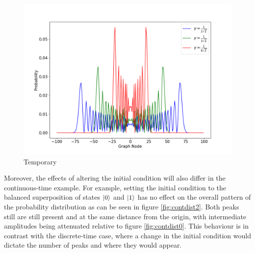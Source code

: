                \begin{figure}[!h]
                    \centering
                    \includegraphics[scale=0.40]{img/ContQW/ctqwMultipleGamma.png}
                    \caption{Temporary} 
                    \label{fig:contdist1}
                \end{figure}
                
            Moreover, the effects of altering the initial condition will also differ in the continuous-time example. For example, setting the initial condition to the balanced superposition of states $\ket{0}$ and $\ket{1}$ has no effect on the overall pattern of the probability distribution as can be seen in figure \ref{fig:contdist2}. Both peaks still are still present and at the same distance from the origin, with intermediate amplitudes being attenuated relative to figure \ref{fig:contdist0}. This behaviour is in contrast with the discrete-time case, where a change in the initial condition would dictate the number of peaks and where they would appear.
            
